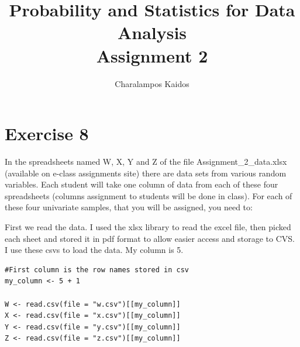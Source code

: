 \documentclass{article}
\begin{document}
\title{Probability and Statistics for Data Analysis\\Assignment 2}
\author{Charalampos Kaidos}

\maketitle

\section*{Exercise 8}

In the spreadsheets named W, X, Y and Z of the file Assignment\_2\_data.xlsx
(available on e-class assignments site) there are data sets from various random
variables. Each student will take one column of data from each of these four
spreadsheets (columns assignment to students will be done in class). For each of
these four univariate samples, that you will be assigned, you need to:

First we read the data. I used the xlsx library to read the excel file, then
picked each sheet and stored it in pdf format to allow easier access and storage
to CVS. I use these csvs to load the data. My column is 5.

\begin{lstlisting}
#First column is the row names stored in csv
my_column <- 5 + 1 

W <- read.csv(file = "w.csv")[[my_column]]
X <- read.csv(file = "x.csv")[[my_column]]
Y <- read.csv(file = "y.csv")[[my_column]]
Z <- read.csv(file = "z.csv")[[my_column]]
\end{lstlisting}
\end{document}
